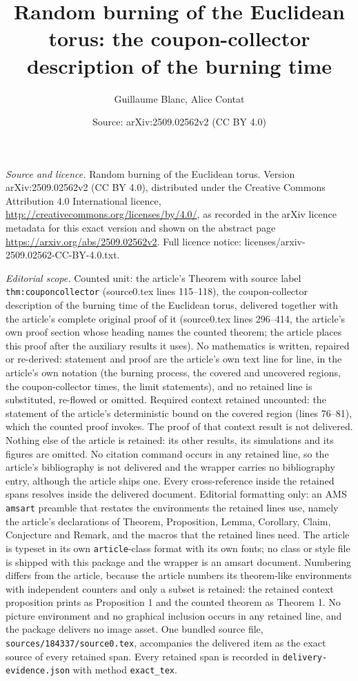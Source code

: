 \documentclass[10pt,a4paper]{amsart}
\title[Random burning of the Euclidean torus]{Random burning of the Euclidean torus: the coupon-collector description of the burning time}
\author{Guillaume Blanc, Alice Contat}
\date{Source: arXiv:2509.02562v2 (CC BY 4.0)}
\theoremstyle{plain}
\theoremstyle{remark}
\begin{document}
\maketitle
\noindent\emph{Source and licence.} Random burning of the Euclidean torus. Version arXiv:2509.02562v2 (CC BY 4.0), distributed under the Creative Commons Attribution 4.0 International licence, \url{http://creativecommons.org/licenses/by/4.0/}, as recorded in the arXiv licence metadata for this exact version and shown on the abstract page \url{https://arxiv.org/abs/2509.02562v2}. Full licence notice: licenses/arxiv-2509.02562-CC-BY-4.0.txt.\par\smallskip

\noindent\textit{Editorial scope.} Counted unit: the article's Theorem with source label \texttt{thm:couponcollector} (source0.tex lines 115--118), the coupon-collector description of the burning time of the Euclidean torus, delivered together with the article's complete original proof of it (source0.tex lines 296--414, the article's own proof section whose heading names the counted theorem; the article places this proof after the auxiliary results it uses). No mathematics is written, repaired or re-derived: statement and proof are the article's own text line for line, in the article's own notation (the burning process, the covered and uncovered regions, the coupon-collector times, the limit statements), and no retained line is substituted, re-flowed or omitted. Required context retained uncounted: the statement of the article's deterministic bound on the covered region (lines 76--81), which the counted proof invokes. The proof of that context result is not delivered. Nothing else of the article is retained: its other results, its simulations and its figures are omitted. No citation command occurs in any retained line, so the article's bibliography is not delivered and the wrapper carries no bibliography entry, although the article ships one. Every cross-reference inside the retained spans resolves inside the delivered document. Editorial formatting only: an AMS \texttt{amsart} preamble that restates the environments the retained lines use, namely the article's declarations of Theorem, Proposition, Lemma, Corollary, Claim, Conjecture and Remark, and the macros that the retained lines need. The article is typeset in its own \texttt{article}-class format with its own fonts; no class or style file is shipped with this package and the wrapper is an amsart document. Numbering differs from the article, because the article numbers its theorem-like environments with independent counters and only a subset is retained: the retained context proposition prints as Proposition 1 and the counted theorem as Theorem 1. No picture environment and no graphical inclusion occurs in any retained line, and the package delivers no image asset. One bundled source file, \texttt{sources/184337/source0.tex}, accompanies the delivered item as the exact source of every retained span. Every retained span is recorded in \texttt{delivery-evidence.json} with method \texttt{exact\_tex}.
\end{document}
